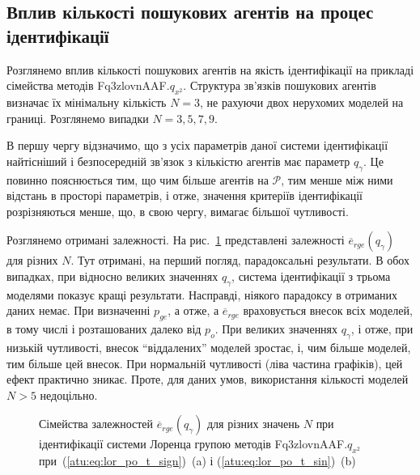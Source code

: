 


\subsection{Вплив кількості пошукових агентів на процес ідентифікації} %

Розглянемо вплив кількості пошукових агентів на якість
ідентифікації на прикладі сімейства методів
Fq3zlovnAAF.$q_{x^2}$.
Структура зв'язків пошукових агентів визначає їх мінімальну кількість
$N = 3 $, не рахуючи двох нерухомих моделей на границі. Розглянемо
випадки $ N = 3,5,7,9 $.

В першу чергу відзначимо, що з усіх параметрів даної системи
ідентифікації найтісніший і безпосередній зв'язок з кількістю
агентів має параметр $ q_\gamma$.
Це повинно пояснюється тим, що чим більше агентів на
$\mathcal{P}$, тим менше між ними відстань в просторі параметрів, і
отже, значення критеріїв ідентифікації розрізняються менше,
що, в свою чергу, вимагає більшої чутливості.

Розглянемо отримані залежності. На рис.~\ref{atu:f:lor_N_rge} представлені
залежності $ \overline{e}_{rge} (q_\gamma) $ для різних
$N $. Тут отримані, на перший погляд, парадоксальні результати. В
обох випадках, при відносно великих значеннях
$q_\gamma $, система ідентифікації з трьома моделями показує кращі
результати. Насправді, ніякого парадоксу в отриманих даних
немає. При визначенні
$p_{ge} $, а отже, а
$\overline{e}_{rge} $ враховується внесок всіх моделей, в тому числі і
розташованих далеко від
$p_o$. При великих значеннях
$q_\gamma$, і отже, при низькій чутливості, внесок ``віддалених''
моделей зростає, і, чим більше моделей, тим більше цей
внесок. При нормальній чутливості (ліва частина графіків), цей
ефект практично зникає. Проте, для даних умов, використання
кількості моделей
$N>5$ недоцільно.



\begin{figure}[htb!]
  \caption{Сімейства залежностей $\overline{e}_{rge} (q_\gamma)$ для різних значень $ N $ при ідентифікації системи Лоренца групою методів Fq3zlovnAAF.$ q_{x^2} $ при~(\ref{atu:eq:lor_po_t_sign})~(a) і (\ref{atu:eq:lor_po_t_sin})~(b)}
\label{atu:f:lor_N_rge}
\end{figure}


